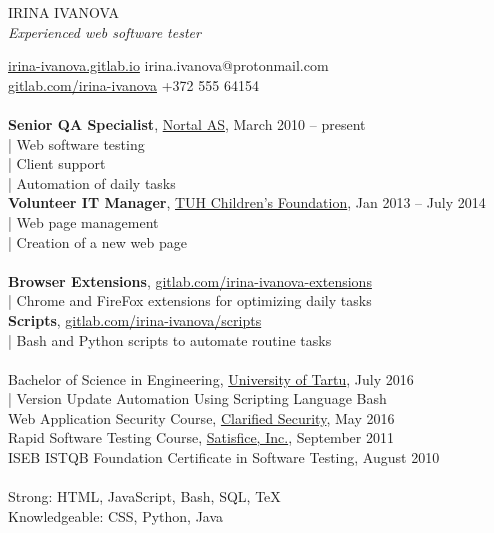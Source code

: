 \documentclass[a4paper, 12pt]{article}
\begin{document}
\begin{center}
  {\LARGE{IRINA IVANOVA}}\\
  \textit{Experienced web software tester}
\end{center}
\href{https://irina-ivanova.gitlab.io}{irina-ivanova.gitlab.io}
\hspace{4.5cm}
irina.ivanova@protonmail.com\\
\href{https://gitlab.com/irina-ivanova}{gitlab.com/irina-ivanova}
\hspace{6.6cm}
+372 555 64154\\

\\
\textbf{Senior QA Specialist}, \href{https://nortal.com}{Nortal AS}, March 2010 \--- present\\
\indent | Web software testing\\
\indent | Client support\\
\indent | Automation of daily tasks\\
\textbf{Volunteer IT Manager}, \href{https://www.lastefond.ee}{TUH Children's Foundation}, Jan 2013 \--- July 2014\\
\indent | Web page management\\
\indent | Creation of a new web page\\

\\
\textbf{Browser Extensions}, \href{https://gitlab.com/irina-ivanova-extensions}{gitlab.com/irina-ivanova-extensions}\\
\indent | Chrome and FireFox extensions for optimizing daily tasks\\
\textbf{Scripts}, \href{https://gitlab.com/irina-ivanova/scripts}{gitlab.com/irina-ivanova/scripts}\\
\indent | Bash and Python scripts to automate routine tasks\\

\\
Bachelor of Science in Engineering, \href{https://www.ut.ee/en}{University of Tartu}, July 2016\\
\indent | Version Update Automation Using Scripting Language Bash\\
Web Application Security Course, \href{https://www.clarifiedsecurity.com/web-application-security-training/}{Clarified Security}, May 2016\\
Rapid Software Testing Course, \href{http://www.satisfice.com/info_rst.shtml}{Satisfice, Inc.}, September 2011\\
ISEB ISTQB Foundation Certificate in Software Testing, August 2010\\

\\
Strong: HTML, JavaScript, Bash, SQL, TeX\\
Knowledgeable: CSS, Python, Java

\pagestyle{empty}
\end{document}
